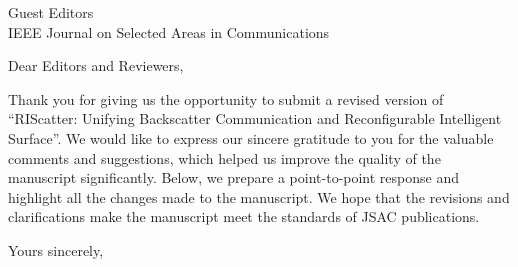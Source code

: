 \documentclass[10pt]{scrartcl}
\begin{document}

\begin{letter}{%
		Guest Editors\\
		IEEE Journal on Selected Areas in Communications
	}
	\opening{Dear Editors and Reviewers,}
	Thank you for giving us the opportunity to submit a revised version of ``RIScatter: Unifying Backscatter Communication and Reconfigurable Intelligent Surface''.
	We would like to express our sincere gratitude to you for the valuable comments and suggestions, which helped us improve the quality of the manuscript significantly.
	Below, we prepare a point-to-point response and highlight all the changes made to the manuscript.
	We hope that the revisions and clarifications make the manuscript meet the standards of JSAC publications.
	\closing{Yours sincerely,}
\end{letter}
\end{document}
